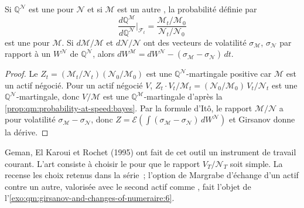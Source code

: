 \begin{theorem}\label{thm:qm:girsanov-and-changes-of-numeraire:change}
Si $\mathbb Q^{\mathcal N}$ est une  pour $\mathcal N$ et si $\mathcal M$ est un autre
, la probabilité définie par
\[
\frac{d\mathbb Q^{\mathcal M}}{d\mathbb Q^{\mathcal N}}\bigg|_{\mathcal F_t} = \frac{\mathcal M_t/\mathcal M_0}{\mathcal N_t/\mathcal N_0}
\]
est une  pour $\mathcal M$. Si $d\mathcal M/\mathcal M$ et $d\mathcal N/\mathcal N$ ont des
vecteurs de volatilité $\sigma_{\mathcal M}$, $\sigma_{\mathcal N}$ par rapport à un  $W^{\mathcal N}$ de $\mathbb
Q^{\mathcal N}$, alors $dW^{\mathcal M} = dW^{\mathcal N} - (\sigma_{\mathcal M} - \sigma_{\mathcal N})\,dt$.
\end{theorem}

\begin{proof}
Le  $Z_t = (\mathcal M_t/\mathcal N_t)(\mathcal N_0/\mathcal M_0)$ est une $\mathbb Q^{\mathcal N}$-martingale positive
car $\mathcal M$ est un actif négocié. Pour un actif négocié $V$, $Z_t\cdot V_t/\mathcal M_t = (\mathcal N_0/\mathcal M_0)\,V_t/\mathcal N_t$ est une
$\mathbb Q^{\mathcal N}$-martingale, donc $V/\mathcal M$ est une $\mathbb Q^{\mathcal M}$-martingale d'après
la \cref{prop:qm:probability-at-speed:bayes}. Par la formule d'Itô, le rapport $\mathcal M/\mathcal N$ a pour volatilité
$\sigma_{\mathcal M} - \sigma_{\mathcal N}$, donc $Z = \mathcal E(\int(\sigma_{\mathcal M} - \sigma_{\mathcal N})\,dW^{\mathcal N})$ et Girsanov
donne la dérive.
\end{proof}

Geman, El Karoui et Rochet (1995) ont fait de cet outil un instrument de travail courant. L'art consiste à choisir le
 pour que le rapport $V_T/\mathcal N_T$ soit simple. La 
recense les choix retenus dans la série~; l'option de Margrabe d'échange d'un actif contre un autre, valorisée
avec le second actif comme , fait l'objet de l'\cref{exo:qm:girsanov-and-changes-of-numeraire:6}.

